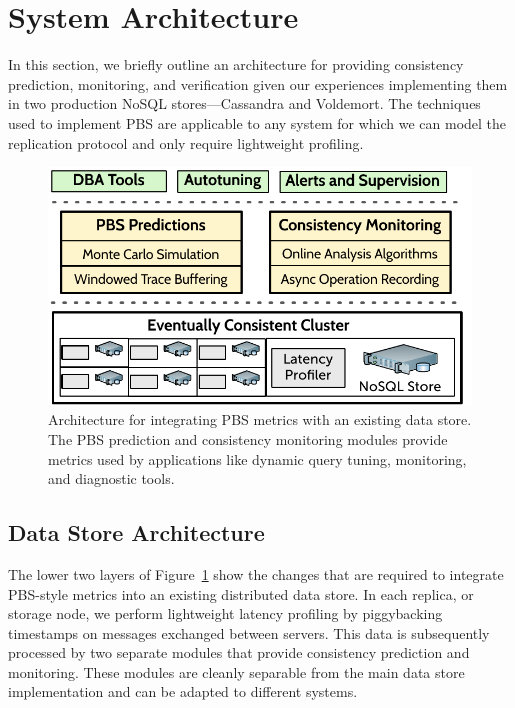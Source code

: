 \section{System Architecture}
\label{sec:architecture}

In this section, we briefly outline an architecture for providing
consistency prediction, monitoring, and verification given our
experiences implementing them in two production NoSQL
stores---Cassandra and Voldemort. The techniques used to implement PBS
are applicable to any system for which we can model the replication
protocol and only require lightweight profiling.


\begin{figure}
\centering
\includegraphics[width=\columnwidth]{figs/cluster-arch.pdf}
\caption{Architecture for integrating PBS metrics with an existing
  data store. The PBS prediction and consistency monitoring modules
  provide metrics used by applications like dynamic
  query tuning, monitoring, and diagnostic tools.}\vspace{-1em}
\label{fig:pbs-sys-arch}
\end{figure}


\subsection{Data Store Architecture}
\label{sec:dbarch}

The lower two layers of Figure~\ref{fig:pbs-sys-arch} show the changes
that are required to integrate PBS-style metrics into an existing
distributed data store. In each replica, or storage node, we perform
lightweight latency profiling by piggybacking timestamps on messages
exchanged between servers. This data is subsequently processed by two
separate modules that provide consistency prediction and monitoring.
These modules are cleanly separable from the main data store
implementation and can be adapted to different systems.\\

